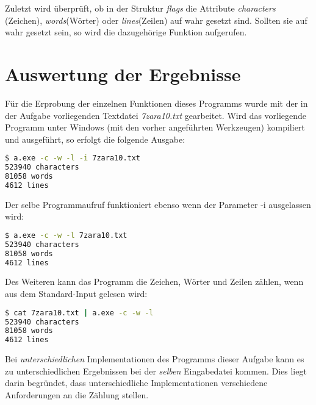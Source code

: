 \documentclass[10pt,a4paper]{article}
\begin{document}
\begin{spacing}{1}
Zuletzt wird überprüft, ob in der Struktur {\it flags\/} die Attribute {\it characters\/} (Zeichen), {\it words\/}(Wörter) oder {\it lines\/}(Zeilen) auf wahr gesetzt sind.
Sollten sie auf wahr gesetzt sein, so wird die dazugehörige Funktion aufgerufen.


\section{Auswertung der Ergebnisse}

Für die Erprobung der einzelnen Funktionen dieses Programms wurde mit der in der Aufgabe vorliegenden Textdatei {\it 7zara10.txt\/} gearbeitet. Wird das vorliegende Programm unter Windows (mit den vorher angeführten Werkzeugen) kompiliert und ausgeführt, so erfolgt die folgende Ausgabe:
\begin{lstlisting}[language=bash]
$ a.exe -c -w -l -i 7zara10.txt
523940 characters
81058 words
4612 lines   
\end{lstlisting}

Der selbe Programmaufruf funktioniert ebenso wenn der Parameter -i ausgelassen wird:
\begin{lstlisting}[language=bash]
$ a.exe -c -w -l 7zara10.txt
523940 characters
81058 words
4612 lines     
\end{lstlisting}

Des Weiteren kann das Programm die Zeichen, Wörter und Zeilen zählen, wenn aus dem Standard-Input gelesen wird:

\begin{lstlisting}[language=bash]
$ cat 7zara10.txt | a.exe -c -w -l
523940 characters
81058 words
4612 lines     
\end{lstlisting}

Bei \emph{unterschiedlichen} Implementationen des Programms dieser Aufgabe kann es zu unterschiedlichen Ergebnissen bei der \emph{selben} Eingabedatei kommen. 
Dies liegt darin begründet, dass unterschiedliche Implementationen verschiedene Anforderungen an die Zählung stellen.
\end{spacing}
\end{document}
